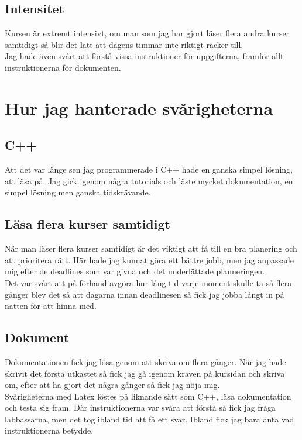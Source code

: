 \documentclass{TDP005mall}
\begin{document}
\subsection{Intensitet}
Kursen är extremt intensivt, om man som jag har gjort läser flera andra kurser samtidigt så blir 
det lätt att dagens timmar inte riktigt räcker till. \\
Jag hade även svårt att förstå vissa instruktioner för uppgifterna, framför allt instruktionerna 
för dokumenten.


\section{Hur jag hanterade svårigheterna}
\subsection{C++}
Att det var länge sen jag programmerade i C++ hade en ganska simpel lösning, att läsa på. Jag 
gick igenom några tutorials och läste mycket dokumentation, en simpel lösning men ganska tidskrävande. \\
\subsection{Läsa flera kurser samtidigt}
När man läser flera kurser samtidigt är det viktigt att få till en bra planering och att prioritera 
rätt. Här hade jag kunnat göra ett bättre jobb, men jag anpassade mig efter de deadlines som var givna 
och det underlättade planneringen. \\
Det var svårt att på förhand avgöra hur lång tid varje moment skulle ta 
så flera gånger blev det så att dagarna innan deadlinesen så fick jag jobba långt in på natten för 
att hinna med. \\
\subsection{Dokument}
Dokumentationen fick jag lösa genom att skriva om flera gånger. När jag hade skrivit det första utkastet 
så fick jag gå igenom kraven på kursidan och skriva om, efter att ha gjort det några gånger så 
fick jag nöja mig. \\
Svårigheterna med Latex löstes på liknande sätt som C++, läsa dokumentation och 
testa sig fram. Där instruktionerna var svåra att förstå så fick jag fråga labbassarna, men det tog ibland 
tid att få ett svar. Ibland fick jag bara anta vad instruktionerna betydde.
\end{document}
